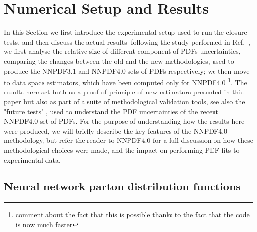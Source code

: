 \section{Numerical Setup and Results}

In this Section we first introduce the experimental setup used to run the
closure tests, and then discuss the actual results: following the study performed in 
Ref.~\cite{nnpdf30}, we first analyse the relative 
size of different component of PDFs uncertainties, comparing the changes between the old
and the new methodologies, used to produce the NNPDF3.1 and NNPDF4.0 sets of PDFs respectively; 
we then move to data space estimators, which have been computed only for NNPDF4.0
\footnote{comment about the fact that this is possible thanks to the fact that the code is now much faster}.
The results here act both as a proof of principle of new estimators presented in this paper but also
as part of a suite of methodological validation tools, see also the "future
tests" \cite{Cruz_Martinez_2021}, used to understand the PDF uncertainties of
the recent NNPDF4.0 set of PDFs. For the purpose of understanding how the
results here were produced, we will briefly describe the key features of the
NNPDF4.0 methodology, but refer the reader to NNPDF4.0 for a full discussion on
how these methodological choices were made, and the impact on performing PDF
fits to experimental data.

\subsection{Neural network parton distribution functions}

